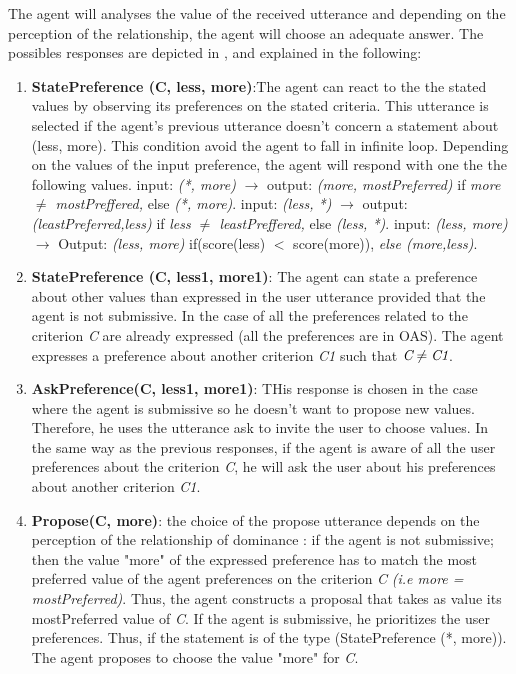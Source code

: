 \documentclass{llncs}
\begin{document}
	\par The agent will analyses the value of the received utterance and depending on the perception of the relationship, the agent will choose  an adequate answer. The possibles responses are depicted in , and explained in the following: 
	\begin{enumerate}
		\item \textbf{StatePreference (C, less, more)}:The agent can react to the the stated values by observing its preferences on the stated criteria. This utterance is selected if the agent's previous utterance doesn't concern a statement about (less, more). This condition avoid the agent to fall in infinite loop.  Depending on the values of the input preference, the agent will respond with one the the following values. 
			\subitem input: \textit{(*, more)} $\rightarrow$ 
				output: \textit{(more, mostPreferred)} if \textit{more $\not = $ mostPreffered,} else \textit{(*, more)}.
			\subitem input: \textit{(less, *)} $\rightarrow$ 
				output: \textit{(leastPreferred,less)} if \textit{less $\not = $ leastPreffered,} else \textit{(less, *)}.
			\subitem input: \textit{(less, more)} $\rightarrow$ Output:  \textit{(less, more)} if(score(less) $<$ score(more)), \textit{else (more,less)}.
			
		\item \textbf{StatePreference (C, less1, more1)}: The agent can state a preference about other values than expressed in the user utterance provided that the agent is not submissive. In the case of all the preferences related to the criterion \emph{C} are already expressed (all the preferences are in OAS). The agent expresses a preference about another criterion \emph{C1} such that $\emph{C} \not = \emph{C1}$.
		
		\item \textbf{AskPreference(C, less1, more1)}: THis response is chosen in the case where the agent is submissive so he doesn't want to propose new values. Therefore, he uses the utterance ask to invite the user to choose values. In the same way as the previous responses, if the agent is aware of all the user preferences about the criterion \emph{C}, he will ask the user about his preferences about another criterion \emph{C1}.
		
		
		\item  \textbf{Propose(C, more)}: the choice of the propose utterance depends on the perception of the relationship of dominance : 
			\subitem if the agent is not submissive; then  the value "more" of the expressed preference has to match the most preferred value of the agent preferences on the criterion \emph{C} \textit{(i.e more = mostPreferred)}. Thus, the agent constructs a proposal that takes as value its mostPreferred value of  \emph{C}.
			\subitem If the agent is submissive, he prioritizes the user preferences. Thus, if the statement is of the type (StatePreference (*, more)). The agent proposes to choose the value "more" for \emph{C}.
	\end{enumerate}
\end{document}
